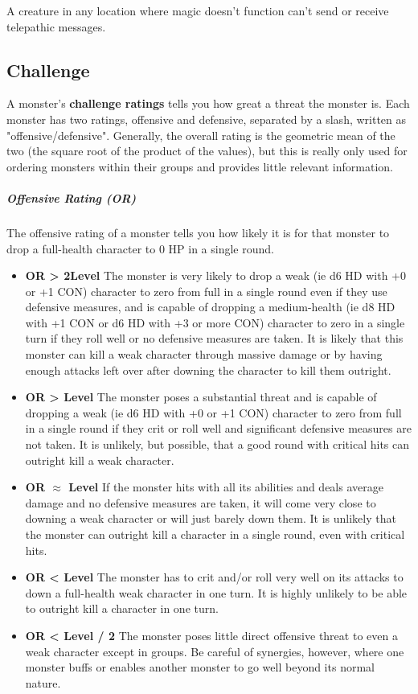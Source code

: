 A creature in any location where magic doesn't function can't send or receive telepathic messages.

\subsection{Challenge}

A monster's \textbf*{challenge ratings} tells you how great a threat the monster is. Each monster has two ratings, offensive and defensive, separated by a slash, written as "offensive/defensive". Generally, the overall rating is the geometric mean of the two (the square root of the product of the values), but this is really only used for ordering monsters within their groups and provides little relevant information.

\subparagraph*{Offensive Rating (OR)} The offensive rating of a monster tells you how likely it is for that monster to drop a full-health character to 0 HP in a single round.

\begin{itemize}
	\item[] \textbf{OR > 2\texttimes Level} The monster is very likely to drop a weak (ie d6 HD with +0 or +1 CON) character to zero from full in a single round even if they use defensive measures, and is capable of dropping a medium-health (ie d8 HD with +1 CON or d6 HD with +3 or more CON) character to zero in a single turn if they roll well or no defensive measures are taken. It is likely that this monster can kill a weak character through massive damage or by having enough attacks left over after downing the character to kill them outright.
	\item[] \textbf{OR > Level} The monster poses a substantial threat and is capable of dropping a weak (ie d6 HD with +0 or +1 CON) character to zero from full in a single round if they crit or roll well and significant defensive measures are not taken. It is unlikely, but possible, that a good round with critical hits can outright kill a weak character.
	\item[] \textbf{OR $\approx$ Level} If the monster hits with all its abilities and deals average damage and no defensive measures are taken, it will come very close to downing a weak character or will just barely down them. It is unlikely that the monster can outright kill a character in a single round, even with critical hits.
	\item[] \textbf{OR < Level} The monster has to crit and/or roll very well on its attacks to down a full-health weak character in one turn. It is highly unlikely to be able to outright kill a character in one turn.
	\item[] \textbf{OR < Level / 2} The monster poses little direct offensive threat to even a weak character except in groups. Be careful of synergies, however, where one monster buffs or enables another monster to go well beyond its normal nature.
\end{itemize}

